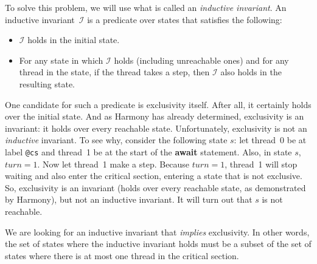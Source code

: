 \documentclass{report}
\begin{document}
To solve this problem, we will use what is called an
\emph{inductive invariant}.
%
An inductive invariant~$\mathcal{I}$ is a predicate over states that satisfies the following:
\begin{itemize}
\item $\mathcal{I}$ holds in the initial state.
\item For any state in which $\mathcal{I}$ holds (including unreachable ones) and for any
thread in the state, if the thread takes a step, then $\mathcal{I}$ also holds in the
resulting state.
\end{itemize}

One candidate for such a predicate is exclusivity itself.
After all, it certainly holds over the initial state.
And as Harmony has already determined, exclusivity is an invariant:
it holds over every reachable state.
Unfortunately, exclusivity is not an \emph{inductive} invariant.
To see why, consider the following state $s$: let thread~0 be at label \texttt{@cs}
and thread~1 be at the start of the \textbf{await} statement.
Also, in state $s$, $\mathit{turn} = 1$.  Now let
thread~1 make a step.  Because $\mathit{turn} = 1$,
thread~1 will stop waiting and also enter the critical
section, entering a state that is not exclusive.
So, exclusivity is an invariant (holds over every reachable state, as demonstrated
by Harmony),
but not an inductive invariant.
It will turn out that $s$ is not reachable.

We are looking for an inductive invariant that \emph{implies} exclusivity.
In other words, the set of states where the inductive invariant holds
must be a subset of the set of states where there is at most one thread in
the critical section.
\end{document}
